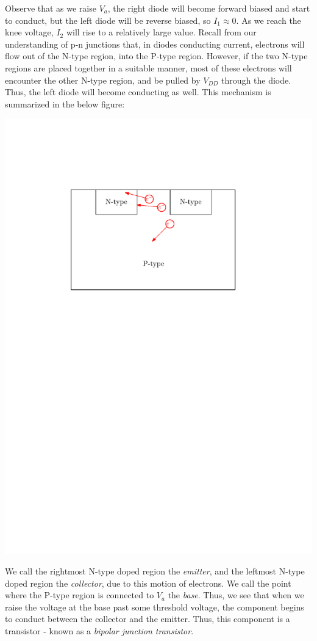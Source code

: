 \documentclass[letterpaper]{article}
\theoremstyle{remark}
\begin{document}
Observe that as we raise $V_a$, the right diode will become forward biased and start to conduct, but the left diode will be reverse biased, so $I_1 \approx 0$. As we reach the knee voltage, $I_2$ will rise to a relatively large value. Recall from our understanding of p-n junctions that, in diodes conducting current, electrons will flow out of the N-type region, into the P-type region. However, if the two N-type regions are placed together in a suitable manner, most of these electrons will encounter the other N-type region, and be pulled by $V_{DD}$ through the diode. Thus, the left diode will become conducting as well. This mechanism is summarized in the below figure:
\begin{center}
    \includegraphics[scale=0.7]{bipolar_transistor_conducting.pdf}
\end{center}
We call the rightmost N-type doped region the \emph{emitter}, and the leftmost N-type doped region the \emph{collector}, due to this motion of electrons. We call the point where the P-type region is connected to $V_a$ the \emph{base}. Thus, we see that when we raise the voltage at the base past some threshold voltage, the component begins to conduct between the collector and the emitter. Thus, this component is a transistor - known as a \emph{bipolar junction transistor}.
\end{document}
